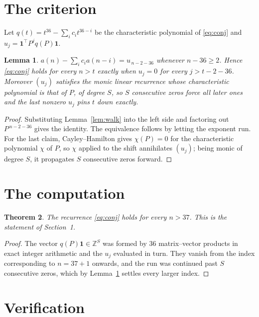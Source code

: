\documentclass[11pt,a4paper]{article}
\theoremstyle{plain}
\newtheorem{theorem}{Theorem}
\newtheorem{lemma}[theorem]{Lemma}
\theoremstyle{definition}
\begin{document}
\section{The criterion}

Let $q(t)=t^{36}-\sum_i c_i t^{36-i}$ be the characteristic polynomial of
\eqref{eq:conj} and $u_j=\mathbf{1}^{\!\top}P^{j}q(P)\mathbf{1}$.

\begin{lemma}\label{lem:crit}
$a(n)-\sum_i c_i a(n-i)=u_{\,n-2-36}$ whenever $n-36\ge2$. Hence
\eqref{eq:conj} holds for every $n>t$ exactly when $u_j=0$ for every
$j>t-2-36$. Moreover $(u_j)$ satisfies the monic linear recurrence whose
characteristic polynomial is that of $P$, of degree $S$, so $S$ consecutive zeros force all
later ones and the last nonzero $u_j$ pins $t$ down exactly.
\end{lemma}

\begin{proof}
Substituting Lemma~\ref{lem:walk} into the left side and factoring out
$P^{\,n-2-36}$ gives the identity. The equivalence follows by letting the exponent
run. For the last claim, Cayley--Hamilton gives $\chi(P)=0$ for the characteristic
polynomial $\chi$ of $P$, so $\chi$ applied to the shift annihilates $(u_j)$; being monic of
degree $S$, it propagates $S$ consecutive zeros forward.
\end{proof}

\section{The computation}

\begin{theorem}
The recurrence \eqref{eq:conj} holds for every $n>37$. This is the statement of
Section~1.
\end{theorem}

\begin{proof}
The vector $q(P)\mathbf{1}\in\mathbb{Z}^{S}$ was formed by $36$ matrix--vector
products in exact integer arithmetic and the $u_j$ evaluated in turn. They vanish from the
index corresponding to $n=37+1$ onwards, and the run was continued past $S$ consecutive
zeros, which by Lemma~\ref{lem:crit} settles every larger index.
\end{proof}

\section{Verification}
\end{document}
